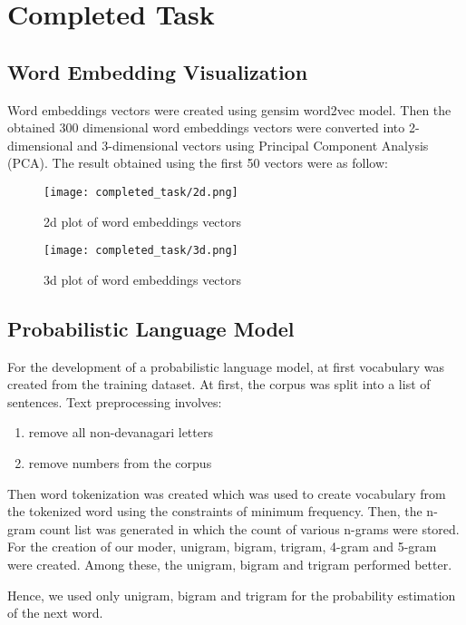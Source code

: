 \chapter{Completed Task}
\section{Word Embedding Visualization}
Word embeddings vectors were created using gensim word2vec model. Then the obtained 300 dimensional word embeddings vectors were converted into 2-dimensional and 3-dimensional vectors using Principal Component Analysis (PCA). The result obtained using the first 50 vectors were as follow:

\begin{figure}[H]
	\centering
	\texttt{[image: completed\_task/2d.png]}
	\caption{2d plot of word embeddings vectors}
	\label{fig:2d plot of word embeddings vectors}
\end{figure}

\begin{figure}[H]
	\centering
	\texttt{[image: completed\_task/3d.png]}
	\caption{3d plot of word embeddings vectors}
	\label{fig:3d plot of word embeddings vectors}
\end{figure}


\section{Probabilistic Language Model}
For the development of a probabilistic language model, at first vocabulary was created from the training dataset. At first, the corpus was split into a list of sentences. Text preprocessing involves:

\begin{enumerate}
    \item remove all non-devanagari letters
    \item remove numbers from the corpus
\end{enumerate}


Then word tokenization was created which was used to create vocabulary from the tokenized word using the constraints of minimum frequency. Then, the n-gram count list was generated in which the count of various n-grams were stored. For the creation of our moder, unigram, bigram, trigram, 4-gram and 5-gram were created. Among these, the unigram, bigram and trigram performed better. 

Hence, we used only unigram, bigram and trigram for the probability estimation of the next word.

